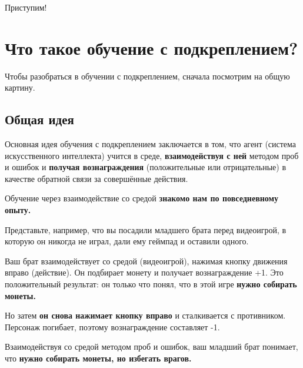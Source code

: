 \documentclass[11pt,a4paper]{article}
\begin{document}

Приступим!

\section{Что такое обучение с подкреплением?}\label{what-is-reinforcement-learning}

Чтобы разобраться в обучении с подкреплением, сначала посмотрим на общую картину.

\subsection{Общая идея}\label{the-big-picture}

Основная идея обучения с подкреплением заключается в том, что агент (система искусственного интеллекта) учится в среде, \textbf{взаимодействуя с ней} методом проб и ошибок и \textbf{получая вознаграждения} (положительные или отрицательные) в качестве обратной связи за совершённые действия.

Обучение через взаимодействие со средой \textbf{знакомо нам по повседневному опыту.}

Представьте, например, что вы посадили младшего брата перед видеоигрой, в которую он никогда не играл, дали ему геймпад и оставили одного.


Ваш брат взаимодействует со средой (видеоигрой), нажимая кнопку движения вправо (действие). Он подбирает монету и получает вознаграждение +1. Это положительный результат: он только что понял, что в этой игре \textbf{нужно собирать монеты.}


Но затем \textbf{он снова нажимает кнопку вправо} и сталкивается с противником. Персонаж погибает, поэтому вознаграждение составляет -1.


Взаимодействуя со средой методом проб и ошибок, ваш младший брат понимает, что \textbf{нужно собирать монеты, но избегать врагов.}
\end{document}
